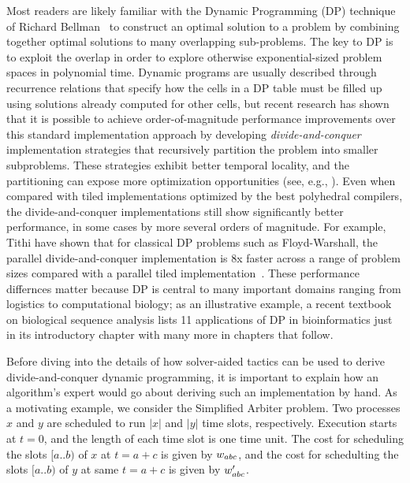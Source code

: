 Most readers are likely familiar with the Dynamic Programming (DP) technique of Richard Bellman~\cite{03/Bellman:DP} to construct an optimal solution to a problem by combining together optimal solutions to many overlapping sub-problems. The key to DP is to exploit the overlap in order to explore otherwise exponential-sized problem spaces in polynomial time. Dynamic programs are usually described through recurrence relations that specify how the cells in a DP table must be filled up using solutions already computed for other cells, but recent research has shown that it is possible to achieve order-of-magnitude performance improvements over this standard implementation approach by developing \emph{divide-and-conquer}  implementation strategies that recursively
partition the problem into smaller subproblems.  These strategies exhibit better temporal locality, and the partitioning can expose more
optimization opportunities (see, e.g., \cite{IPDPS15/Tithi}).  Even when compared with tiled implementations optimized by the best polyhedral compilers, 
the divide-and-conquer implementations still show significantly better performance, in some cases by more several orders of magnitude. For example, Tithi \etal{} have shown that for classical DP problems such as Floyd-Warshall, the parallel divide-and-conquer implementation is  8x faster  across a range of problem sizes compared with a parallel tiled implementation~\cite{IPDPS15/Tithi}. These performance differnces matter because  DP is central to many important domains ranging from logistics to computational biology; as an illustrative example, a recent textbook \cite{DurbinEdKr98} on biological sequence analysis lists 11 applications of DP in bioinformatics just in its introductory chapter with many more in chapters that follow.



Before diving into the details of how solver-aided tactics can be used to derive divide-and-conquer dynamic programming, it is important to explain how an algorithm's expert would go about deriving such an implementation by hand.
As a motivating example, we consider the Simplified Arbiter problem.
Two processes $x$ and $y$ are scheduled to run $|x|$ and $|y|$ time slots,
respectively. Execution starts at $t=0$, and the length of each time slot is
one time unit. The cost for scheduling the slots $[a..b)$ of $x$ at $t=a+c$
is given by $w_{abc}$, and the cost for schedulting the slots $[a..b)$ of $y$
at same $t=a+c$ is given by $w'_{abc}$.

